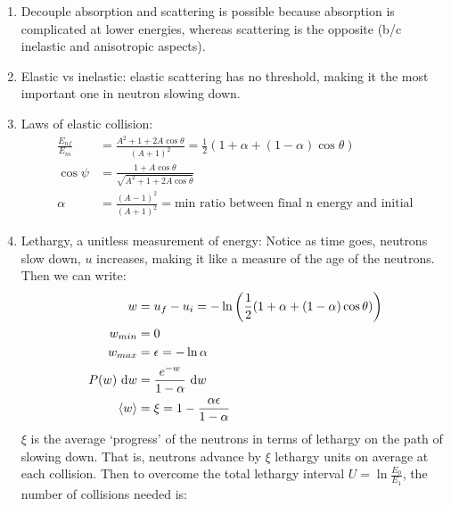 \documentclass{school-22.211-notes}
\date{February 13, 2012}
\begin{document}
\maketitle



\begin{enumerate}
\item Decouple absorption and scattering is possible because absorption is complicated at lower energies, whereas scattering is the opposite (b/c inelastic and anisotropic aspects). 

\item Elastic vs inelastic: elastic scattering has no threshold, making it the most important one in neutron slowing down. 

\item Laws of elastic collision: 
  \begin{align}
    \frac{E_{nf}}{E_{ni}} &= \frac{A^2 + 1 + 2A \cos \theta}{(A+1)^2} = \frac{1}{2} \left( 1 + \alpha + (1-\alpha) \cos \theta \right) \\
    \cos \psi &= \frac{1 + A \cos \theta}{\sqrt{A^2 + 1 + 2A \cos \theta}} \\
    \alpha &= \frac{(A-1)^2}{(A+1)^2} = \mbox{min ratio between final n energy and initial} 
  \end{align}

\item Lethargy, a unitless measurement of energy:
Notice as time goes, neutrons slow down, $u$ increases, making it like a measure of the age of the neutrons. Then we can write:
\begin{align}
w &= u_f - u_i = -\ln \left( \frac{1}{2} ( 1 + \alpha + (1-\alpha) \cos \theta ) \right) \\
w_{min} &= 0 \\
w_{max} &= \epsilon = -\ln \alpha \\
P(w) \mbox{ }\mathrm{d} w &= \frac{e^{-w}}{1 - \alpha} \mbox{ }\mathrm{d} w \\
\left< w \right> &= \xi = 1 - \frac{\alpha \epsilon}{1 - \alpha} 
\end{align}
$\xi$ is the average `progress' of the neutrons in terms of lethargy on the path of slowing down. That is, neutrons advance by $\xi$ lethargy units on average at each collision. Then to overcome the total lethargy interval $U = \ln \frac{E_0}{E_1}$, the number of collisions needed is:


\end{enumerate}
\end{document}
